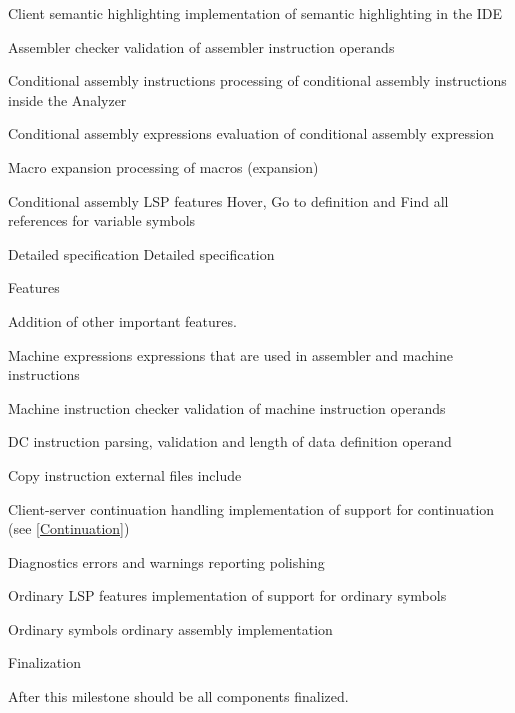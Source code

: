 \bwp
\itemwp Client semantic highlighting 
\tiny implementation of semantic highlighting in the IDE

\itemwp Assembler checker 
\tiny validation of assembler instruction operands

\itemwp Conditional assembly instructions 
\tiny processing of conditional assembly instructions inside the Analyzer

\itemwp Conditional assembly expressions 
\tiny evaluation of conditional assembly expression 

\itemwp Macro expansion 
\tiny processing of macros (expansion)

\itemwp Conditional assembly LSP features 
\tiny Hover, Go to definition and Find all references for variable symbols


\eenum




\itemm Detailed specification 
\bwp
\itemwp Detailed specification 
\eenum


\itemm Features 

\small Addition of other important features.

\bwp

\itemwp Machine expressions 
\tiny expressions that are used in assembler and machine instructions

\itemwp Machine instruction checker 
\tiny validation of machine instruction operands

\itemwp DC instruction 
\tiny parsing, validation and length of data definition operand

\itemwp Copy instruction 
\tiny external files include

\itemwp Client-server continuation handling 
\tiny implementation of support for continuation (see \cref{Continuation})

\itemwp Diagnostics 
\tiny errors and warnings reporting polishing

\itemwp Ordinary LSP features 
\tiny implementation of support for ordinary symbols

\itemwp Ordinary symbols 
\tiny ordinary assembly implementation
\eenum

\itemm Finalization 

\small After this milestone should be all components finalized. 

